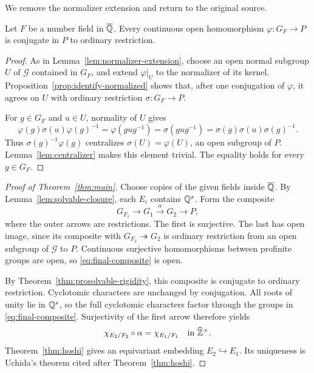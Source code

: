 We remove the normalizer extension and return to the original source.
\begin{theorem}\label{thm:prosolvable-rigidity}
Let $F$ be a number field in $\overline{\mathbb Q}$. Every continuous open homomorphism $\varphi:G_F\to P$ is conjugate in $P$ to ordinary restriction.
\end{theorem}
\begin{proof}
As in Lemma~\ref{lem:normalizer-extension}, choose an open normal subgroup $U$ of $\mathcal G$ contained in $G_F$, and extend $\varphi|_U$ to the normalizer of its kernel. Proposition~\ref{prop:identify-normalized} shows that, after one conjugation of $\varphi$, it agrees on $U$ with ordinary restriction $\sigma:G_F\to P$.

For $g\in G_F$ and $u\in U$, normality of $U$ gives
\[
 \varphi(g)\sigma(u)\varphi(g)^{-1}
 =\varphi(gug^{-1})
 =\sigma(gug^{-1})
 =\sigma(g)\sigma(u)\sigma(g)^{-1}.
\]
Thus $\sigma(g)^{-1}\varphi(g)$ centralizes $\sigma(U)=\varphi(U)$, an open subgroup of $P$. Lemma~\ref{lem:centralizer} makes this element trivial. The equality holds for every $g\in G_F$.
\end{proof}

\begin{proof}[Proof of Theorem~\ref{thm:main}]
Choose copies of the given fields inside $\overline{\mathbb Q}$. By Lemma~\ref{lem:solvable-closure}, each $E_i$ contains $\mathbb Q^s$. Form the composite
\begin{equation}\label{eq:final-composite}
 G_{F_1}\longrightarrow G_1\xrightarrow{\alpha}G_2
     \longrightarrow P,
\end{equation}
where the outer arrows are restrictions. The first is surjective. The last has open image, since its composite with $G_{F_2}\twoheadrightarrow G_2$ is ordinary restriction from an open subgroup of $\mathcal G$ to $P$. Continuous surjective homomorphisms between profinite groups are open, so \eqref{eq:final-composite} is open.

By Theorem~\ref{thm:prosolvable-rigidity}, this composite is conjugate to ordinary restriction. Cyclotomic characters are unchanged by conjugation. All roots of unity lie in $\mathbb Q^s$, so the full cyclotomic characters factor through the groups in \eqref{eq:final-composite}. Surjectivity of the first arrow therefore yields
\[
 \chi_{E_2/F_2}\circ\alpha=\chi_{E_1/F_1}
 \quad\text{in }\widehat{\mathbb Z}^{\times}.
\]
Theorem~\ref{thm:hoshi} gives an equivariant embedding $E_2\hookrightarrow E_1$. Its uniqueness is Uchida's theorem cited after Theorem~\ref{thm:hoshi}.
\end{proof}
